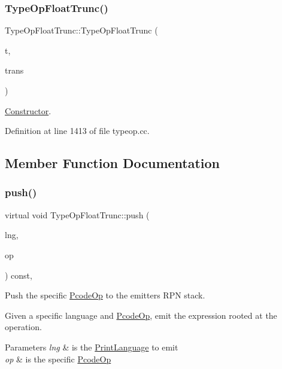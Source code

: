 \subsubsection{\texorpdfstring{TypeOpFloatTrunc()}{TypeOpFloatTrunc()}}
{\footnotesize\ttfamily Type\+Op\+Float\+Trunc\+::\+Type\+Op\+Float\+Trunc (\begin{DoxyParamCaption}\item[{\mbox{\hyperlink{class_type_factory}{Type\+Factory}} $\ast$}]{t,  }\item[{const \mbox{\hyperlink{class_translate}{Translate}} $\ast$}]{trans }\end{DoxyParamCaption})}



\mbox{\hyperlink{class_constructor}{Constructor}}. 



Definition at line 1413 of file typeop.\+cc.



\subsection{Member Function Documentation}
\mbox{\label{class_type_op_float_trunc_a1abcf620c37217e745f4bc6b17d1f4a2}} 
\subsubsection{\texorpdfstring{push()}{push()}}
{\footnotesize\ttfamily virtual void Type\+Op\+Float\+Trunc\+::push (\begin{DoxyParamCaption}\item[{\mbox{\hyperlink{class_print_language}{Print\+Language}} $\ast$}]{lng,  }\item[{const \mbox{\hyperlink{class_pcode_op}{Pcode\+Op}} $\ast$}]{op }\end{DoxyParamCaption}) const\hspace{0.3cm}{\ttfamily [inline]}, {\ttfamily [virtual]}}



Push the specific \mbox{\hyperlink{class_pcode_op}{Pcode\+Op}} to the emitter\textquotesingle{}s R\+PN stack. 

Given a specific language and \mbox{\hyperlink{class_pcode_op}{Pcode\+Op}}, emit the expression rooted at the operation. 
\begin{DoxyParams}{Parameters}
{\em lng} & is the \mbox{\hyperlink{class_print_language}{Print\+Language}} to emit \\
\hline
{\em op} & is the specific \mbox{\hyperlink{class_pcode_op}{Pcode\+Op}} \\
\hline
\end{DoxyParams}


